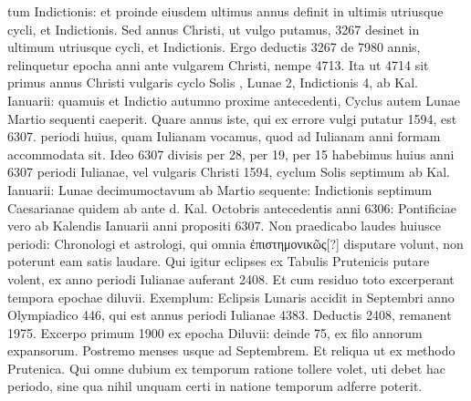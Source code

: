 tum Indictionis: et proinde eiusdem ultimus annus definit in ultimis
utriusque cycli, et Indictionis.
Sed annus Christi, ut vulgo putamus,
3267 desinet in ultimum utriusque cycli, et Indictionis.
Ergo deductis
3267 de 7980 annis, relinquetur epocha anni ante vulgarem
Christi, nempe 4713.
Ita ut 4714 sit primus annus Christi vulgaris cyclo
Solis , Lunae 2, Indictionis 4, ab Kal. Ianuarii: quamuis et Indictio
autumno proxime antecedenti, Cyclus autem Lunae Martio sequenti
caeperit.
Quare annus iste, qui ex errore vulgi putatur 1594, est 6307.
periodi huius, quam Iulianam vocamus, quod ad Iulianam anni formam
accommodata sit.
Ideo 6307 divisis per 28, per 19, per 15 habebimus
huius anni 6307 periodi Iulianae, vel vulgaris Christi 1594, cyclum
Solis septimum ab Kal. Ianuarii:
Lunae decimumoctavum ab
Martio sequente:
Indictionis septimum Caesarianae quidem ab ante d.
 Kal. Octobris antecedentis anni 6306:
Pontificiae vero ab Kalendis
Ianuarii anni propositi 6307.
Non praedicabo laudes huiusce periodi:
Chronologi et astrologi, qui omnia \textgreek{ἐπιστημονικῶς[?]}
 disputare volunt,
non poterunt eam satis laudare.
Qui igitur eclipses ex Tabulis
Prutenicis putare volent, ex anno periodi Iulianae auferant 2408.
Et
cum residuo toto excerperant tempora epochae diluvii.
Exemplum: Eclipsis
Lunaris accidit in Septembri anno Olympiadico 446, qui est annus
periodi Iulianae 4383.
Deductis 2408, remanent 1975.
Excerpo
primum 1900 ex epocha Diluvii: deinde 75, ex filo annorum expansorum.
Postremo menses usque ad Septembrem.
Et reliqua ut ex methodo
Prutenica.
Qui omne dubium ex temporum ratione tollere
volet, uti debet hac periodo, sine qua nihil unquam certi in natione
temporum adferre poterit.
%
